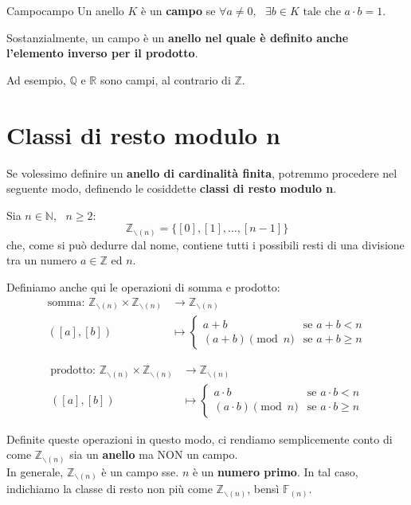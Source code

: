 \documentclass[12pt]{report}
\newcommand{\whitespace}{\text{ }}
\newcommand{\taleche}{\text{ tale che }}
\newcommand{\N}{\mathbb{N}}
\newcommand{\Z}{\mathbb{Z}}
\newcommand{\Q}{\mathbb{Q}}
\newcommand{\R}{\mathbb{R}}
\newcommand{\Zmod}[1]{\Z_{\backslash(#1)}}
\newcommand{\Fmod}[1]{\mathbb{F}_{(#1)}}
\begin{document}
	\begin{definizione}{Campo}{campo}
		Un anello $K$ è un \textbf{campo} se $ \forall a \neq 0,\whitespace \exists b \in K \taleche a \cdot b = 1 $.	
	\end{definizione}
	
	Sostanzialmente, un campo è un \textbf{anello nel quale è definito anche l'elemento inverso per il prodotto}.
	
	Ad esempio, $\Q$ e $\R$ sono campi, al contrario di $\Z$.
	
	
	\section{Classi di resto modulo n}
	Se volessimo definire un \textbf{anello di cardinalità finita}, potremmo procedere nel seguente modo, definendo le cosiddette \textbf{classi di resto modulo n}.
	
	Sia $ n \in \N, \whitespace n \geq 2 $: 
	\[
		\Zmod{n} = \{ [0], [1], \dots, [n-1] \}
	\]
	che, come si può dedurre dal nome, contiene tutti i possibili resti di una divisione tra un numero $ a \in \Z $ ed $n$.
	
	Definiamo anche qui le operazioni di somma e prodotto:
	\[
		\begin{aligned}
			\text{somma: } \Zmod{n} \times \Zmod{n} &\to \Zmod{n} \\
			([a], [b]) &\mapsto
				\begin{cases}
					a + b & \text{se } a + b < n \\
					(a + b) \pmod n & \text{se } a + b \geq n
				\end{cases}
		\end{aligned}
	\]
	
	\[
		\begin{aligned}
			\text{prodotto: } \Zmod{n} \times \Zmod{n} &\to \Zmod{n} \\
			([a], [b]) &\mapsto
			\begin{cases}
				a \cdot b & \text{se } a \cdot b < n \\
				(a \cdot b) \pmod n & \text{se } a \cdot b \geq n
			\end{cases}
		\end{aligned}
	\]
	
	Definite queste operazioni in questo modo, ci rendiamo semplicemente conto di come $\Zmod{n}$ sia un \textbf{anello} ma NON un campo.\\
	In generale, $\Zmod{n}$ è un campo sse. $n$ è un \textbf{numero primo}. In tal caso, indichiamo la classe di resto non più come $\Zmod{n}$, bensì $\Fmod{n}$.
	
\end{document}
